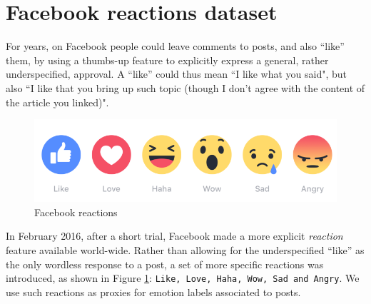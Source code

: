 \documentclass[11pt]{article}
\begin{document}





\section{Facebook reactions dataset}
\label{sec:FBData}



For years, on Facebook people could leave comments to posts, and also ``like'' them, by using a thumbs-up feature to explicitly express a general, rather underspecified, approval. A ``like'' could thus mean ``I like what you said", but also ``I like that you bring up such topic (though I don't agree with the content of the article you linked)". 
\begin{figure}
  \includegraphics[scale=.2]{reactions-image-en_us.png}
  \caption{Facebook reactions}
  \label{fig:facebook_reactions}
\end{figure}
In February 2016, after a short trial, Facebook made a more explicit \textit{reaction} feature available world-wide. Rather than allowing for the underspecified ``like'' as the only wordless response to a post, a set of more specific reactions was introduced, as shown in Figure \ref{fig:facebook_reactions}: \texttt{Like, Love, Haha, Wow, Sad and Angry}. We use such reactions as proxies for emotion labels associated to posts.
\end{document}
